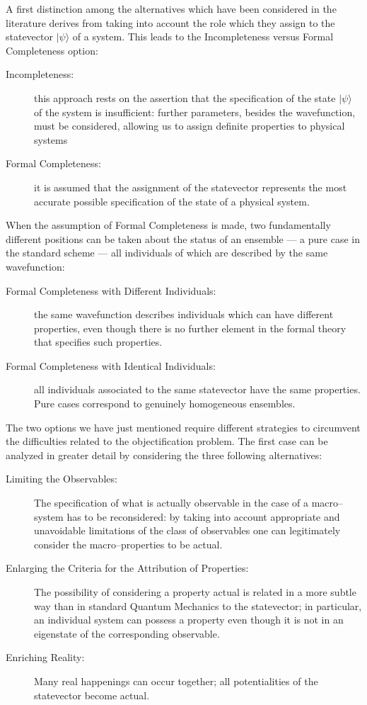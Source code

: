 \documentclass[12pt]{article}
\begin{document}
A first distinction among the alternatives which have been
considered in the literature derives from taking into account the
role which they assign to the statevector $|\psi\rangle$ of a
system. This leads to the Incompleteness versus Formal
Completeness option:
\begin{description}
\item[Incompleteness:] this approach rests on the assertion  that
the specification of the state $|\psi\rangle$ of the system is
insufficient: further parameters, besides the wavefunction, must
be considered, allowing us to assign definite properties to
physical systems
\item[Formal Completeness:] it is assumed that the assignment of
the statevector represents the most accurate possible
specification of the state of a physical system.
\end{description}
When the assumption of Formal Completeness is made, two
fundamentally different positions can be taken about the status of
an ensemble --- a pure case in the standard scheme --- all
individuals of which are described by the same wavefunction:
\begin{description}
\item[Formal Completeness with Different Individuals:] the same
wavefunction de\-scri\-bes individuals which can have different
properties, even though there is no further element in the formal
theory that specifies such properties.
\item[Formal Completeness with Identical Individuals:] all
individuals associated to the same statevector have the same
properties. Pure cases correspond to genuinely homogeneous
ensembles.
\end{description}
The two options we have just mentioned require different
strategies to circumvent the difficulties related to the
objectification problem. The first case can be analyzed in greater
detail by considering the three following alternatives:
\begin{description}
\item[Limiting the Observables:] The specification of what is
actually observable in the case of a macro--system has to be
reconsidered: by taking into account appropriate and unavoidable
limitations of the class of observables one can legitimately
consider the macro--properties to be actual.
\item[Enlarging the Criteria for the Attribution of Properties:] The
possibility of considering a property actual is related in a more
subtle way than in standard Quantum Mechanics to the statevector;
in particular, an individual system can possess a property even
though it is not in an eigenstate of the corresponding observable.
\item[Enriching Reality:] Many real happenings can occur together;
all potentialities of the statevector become actual.
\end{description}
\end{document}
